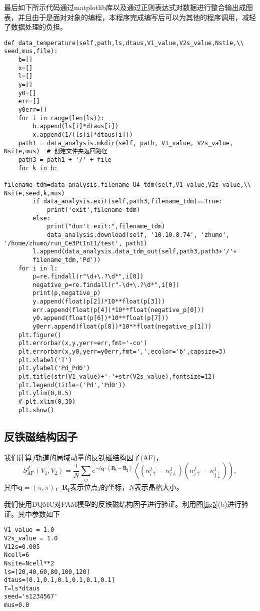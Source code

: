 最后如下所示代码通过matplotlib库以及通过正则表达式对数据进行整合输出成图表，并且由于是面对对象的编程，本程序完成编写后可以为其他的程序调用，减轻了数据处理的负担。
\begin{lstlisting}
def data_temperature(self,path,ls,dtaus,V1_value,V2s_value,Nstie,\\ seed,mus,file):
    b=[]
    x=[]
    l=[]
    y=[]
    y0=[]
    err=[]
    y0err=[]
    for i in range(len(ls)):
        b.append(ls[i]*dtaus[i])
        x.append(1/(ls[i]*dtaus[i]))
    path1 = data_analysis.mkdir(self, path, V1_value, V2s_value, Nsite,mus)  # 创建文件夹返回路径
    path3 = path1 + '/' + file
    for k in b:
        filename_tdm=data_analysis.filename_U4_tdm(self,V1_value,V2s_value,\\ Nsite,seed,k,mus)
        if data_analysis.exit(self,path3,filename_tdm)==True:
            print('exit',filename_tdm)
        else:
            print("don't exit:",filename_tdm)
            data_analysis.download(self, '10.10.8.74', 'zhumo', '/home/zhumo/run_Ce3PtIn11/test', path1)
        l.append(data_analysis.data_tdm_out(self,path3,path3+'/'+
        filename_tdm,'Pd'))
    for i in l:
        p=re.findall(r"\d+\.?\d*",i[0])
        negative_p=re.findall(r"-\d+\.?\d*",i[0])
        print(p,negative_p)
        y.append(float(p[2])*10**float(p[3]))
        err.append(float(p[4])*10**float(negative_p[0]))
        y0.append(float(p[6])*10**float(p[7]))
        y0err.append(float(p[8])*10**float(negative_p[1]))
    plt.figure()
    plt.errorbar(x,y,yerr=err,fmt='-co')
    plt.errorbar(x,y0,yerr=y0err,fmt=',',ecolor='b',capsize=3)
    plt.xlabel('T')
    plt.ylabel('Pd_Pd0')
    plt.title(str(V1_value)+'-'+str(V2s_value),fontsize=12)
    plt.legend(title=('Pd','Pd0'))
    plt.ylim(0,0.5)
    # plt.xlim(0,30)
    plt.show()
\end{lstlisting}



\subsection{反铁磁结构因子}%
我们计算$f$轨道的局域动量的反铁磁结构因子(AF)，
$$
S_{\mathrm{AF}}^{f}\left(V_{1}, V_{2}\right)=\frac{1}{N} \sum_{i j} e^{-i \mathbf{q} \cdot\left(\mathbf{R}_{\mathbf{i}}-\mathbf{R}_{\mathbf{j}}\right)}\left\langle\left(n_{i \uparrow}^{f}-n_{i \downarrow}^{f}\right)\left(n_{j \uparrow}^{f}-n_{j \downarrow}^{f}\right)\right),
$$
其中$\mathbf{q}=(\pi,\pi)$，$\mathbf{R_i}$表示位点$j$的坐标，$N$表示晶格大小。

我们使用DQMC对PAM模型的反铁磁结构因子进行验证。利用图\ref{fig5}(b)进行验证。其中参数如下
\begin{lstlisting}
V1_value = 1.0
V2s_value = 1.0
V12s=0.005
Ncell=6
Nsite=Ncell**2
ls=[20,40,60,80,100,120]
dtaus=[0.1,0.1,0.1,0.1,0.1,0.1]
T=ls*dtaus
seed='s1234567'
mus=0.0
\end{lstlisting}


